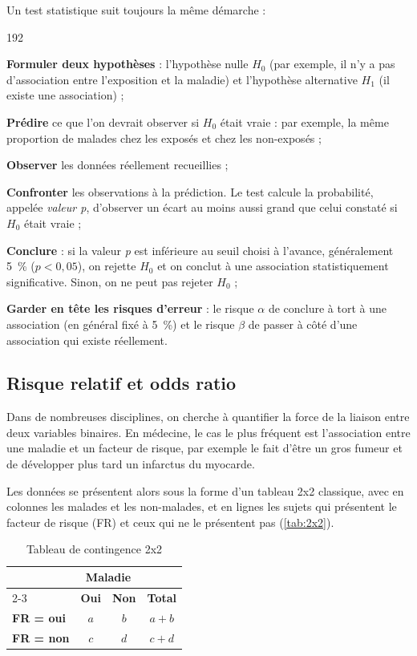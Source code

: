 Un test statistique suit toujours la même démarche :
\begin{dingautolist}{192}
	\item \textbf{Formuler deux hypothèses} : l'hypothèse nulle $H_0$ (par exemple, il n'y a pas d'association entre l'exposition et la maladie) et l'hypothèse alternative $H_1$ (il existe une association) ;
	\item \textbf{Prédire} ce que l'on devrait observer si $H_0$ était vraie : par exemple, la même proportion de malades chez les exposés et chez les non-exposés ;
	\item \textbf{Observer} les données réellement recueillies ;
	\item \textbf{Confronter} les observations à la prédiction. Le test calcule la probabilité, appelée \emph{valeur \textit{p}}, d'observer un écart au moins aussi grand que celui constaté si $H_0$ était vraie ;
	\item \textbf{Conclure} : si la valeur \textit{p} est inférieure au seuil choisi à l'avance, généralement 5~\% ($p < 0{,}05$), on rejette $H_0$ et on conclut à une association statistiquement significative. Sinon, on ne peut pas rejeter $H_0$ ;
	\item \textbf{Garder en tête les risques d'erreur} : le risque $\alpha$ de conclure à tort à une association (en général fixé à 5~\%) et le risque $\beta$ de passer à côté d'une association qui existe réellement.
\end{dingautolist}

\subsection{Risque relatif et odds ratio}

Dans de nombreuses disciplines, on cherche à quantifier la force de la liaison entre deux variables binaires. En médecine, le cas le plus fréquent est l'association entre une maladie et un facteur de risque, par exemple le fait d'être un gros fumeur et de développer plus tard un infarctus du myocarde.

Les données se présentent alors sous la forme d'un tableau 2x2 classique, avec en colonnes les malades et les non-malades, et en lignes les sujets qui présentent le facteur de risque (FR) et ceux qui ne le présentent pas (\autoref{tab:2x2}).

\begin{table}[H]
	\centering
	\caption{Tableau de contingence 2x2}
	\label{tab:2x2}
	\begin{tabular}{|l|c|c|c|}
		\hline
		& \multicolumn{2}{c|}{\textbf{Maladie}} & \\
		\cline{2-3}
		& \textbf{Oui} & \textbf{Non} & \textbf{Total} \\
		\hline
		\textbf{FR = oui} & $a$ & $b$ & $a+b$ \\
		\hline
		\textbf{FR = non} & $c$ & $d$ & $c+d$ \\
		\hline
	\end{tabular}
\end{table}

